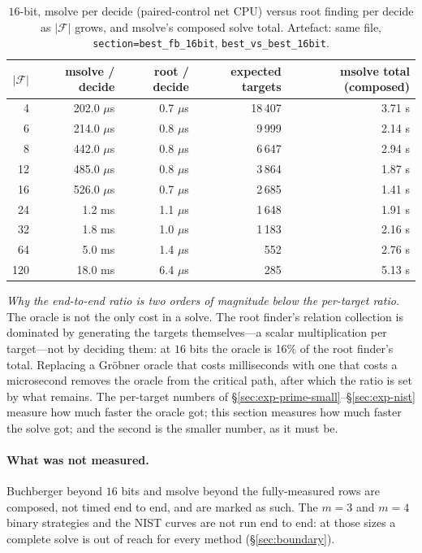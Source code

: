 \documentclass[10pt,a4paper]{article}
\theoremstyle{remark}
\newcommand{\Fb}{\mathcal{F}}
\newcommand{\abs}[1]{\lvert #1 \rvert}
\newcommand{\code}[1]{\texttt{#1}}
\begin{document}
\begin{table}[H]
\centering
\caption{$16$-bit, msolve per decide (paired-control net CPU) versus
root finding per decide as $\abs{\Fb}$ grows, and msolve's composed
solve total. Artefact: same file, \code{section=best\_fb\_16bit},
\code{best\_vs\_best\_16bit}.}
\label{tab:e2e-best}
\begin{tabular}{@{}rrrrr@{}}
\toprule
$\abs{\Fb}$ & msolve / decide & root / decide & expected targets & msolve total (composed) \\
\midrule
4 & 202.0 $\mu$s & 0.7 $\mu$s & 18\,407 & 3.71 s \\
6 & 214.0 $\mu$s & 0.8 $\mu$s & 9\,999 & 2.14 s \\
8 & 442.0 $\mu$s & 0.8 $\mu$s & 6\,647 & 2.94 s \\
12 & 485.0 $\mu$s & 0.8 $\mu$s & 3\,864 & 1.87 s \\
16 & 526.0 $\mu$s & 0.7 $\mu$s & 2\,685 & 1.41 s \\
24 & 1.2 ms & 1.1 $\mu$s & 1\,648 & 1.91 s \\
32 & 1.8 ms & 1.0 $\mu$s & 1\,183 & 2.16 s \\
64 & 5.0 ms & 1.4 $\mu$s & 552 & 2.76 s \\
120 & 18.0 ms & 6.4 $\mu$s & 285 & 5.13 s \\
\bottomrule
\end{tabular}
\end{table}

\emph{Why the end-to-end ratio is two orders of magnitude below the
per-target ratio.} The oracle is not the only cost in a solve. The
root finder's relation collection is dominated by generating the
targets themselves---a scalar multiplication per target---not by
deciding them: at $16$ bits the oracle is 16\% of the
root finder's total. Replacing a Gr\"obner oracle that costs
milliseconds with one that costs a microsecond removes the oracle from
the critical path, after which the ratio is set by what remains. The
per-target numbers of \S\ref{sec:exp-prime-small}--\S\ref{sec:exp-nist}
measure how much faster the oracle got; this section measures how much
faster the solve got; and the second is the smaller number, as it
must be.

\paragraph{What was not measured.} Buchberger beyond $16$ bits and
msolve beyond the fully-measured rows are composed, not timed end to
end, and are marked as such. The $m = 3$ and $m = 4$ binary strategies
and the NIST curves are not run end to end: at those sizes a complete
solve is out of reach for every method (\S\ref{sec:boundary}).
\end{document}
